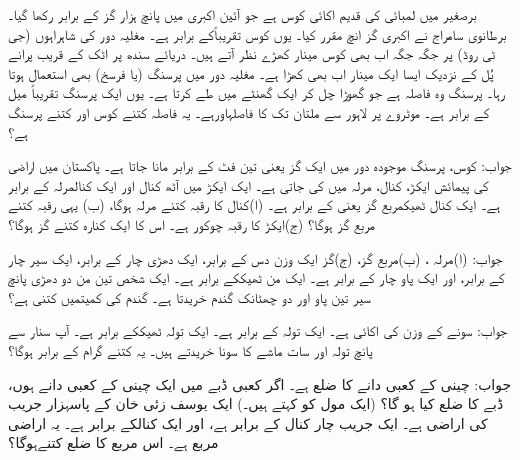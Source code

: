 برصغیر میں لمبائی کی قدیم اکائی کوس ہے جو آئین  اکبری میں پانچ ہزار گز کے برابر رکھا گیا۔ برطانوی سامراج نے  اکبری گز  انچ مقرر کیا۔ یوں  کوس تقریباًکے برابر ہے۔ مغلیہ دور کی شاہراہوں (جی ٹی روڈ) پر جگہ جگہ اب بھی کوس مینار کھڑے نظر آتے ہیں۔ دریائے سندھ پر اٹک کے قریب پرانے پُل کے نزدیک ایسا ایک مینار اب بھی کھڑا ہے۔ مغلیہ دور میں پرسنگ (یا فرسخ)   بھی استعمال ہوتا رہا۔ پرسنگ  وہ فاصلہ ہے جو  گھوڑا چل کر ایک گھنٹے میں طے کرتا ہے۔ یوں ایک پرسنگ تقریباً  میل کے برابر ہے۔ موٹروے پر لاہور سے ملتان تک کا فاصلہاورہے۔ یہ فاصلہ کتنے کوس اور کتنے پرسنگ ہے؟  

جواب: کوس، پرسنگ  
موجودہ دور میں ایک گز   یعنی تین فٹ کے برابر مانا جاتا ہے۔ پاکستان میں  اراضی  کی پیمائش ایکڑ، کنال، مرلہ میں کی جاتی ہے۔ ایک ایکڑ میں آٹھ کنال اور  ایک کنالمرلہ کے برابر ہے۔ ایک کنال ٹھیکمربع گز یعنی  کے برابر ہے۔  (ا)کنال کا رقبہ کتنے مرلہ ہوگا،   (ب) یہی رقبہ کتنے مربع گز ہوگا؟  (ج)ایکڑ کا رقبہ چوکور  ہے۔ اس کا ایک کنارہ کتنے گز ہوگا؟ 

جواب: (ا)مرلہ ، (ب)مربع گز، (ج)گز
ایک   وزن دس  کے برابر، ایک دھڑی  چار  کے برابر، ایک سیر چار  کے برابر،  اور ایک پاو  چار  کے برابر ہے۔ ایک من ٹھیککے برابر ہے۔ ایک شخص تین من دو دھڑی پانچ سیر تین پاو  اور دو چھٹانک  گندم   خریدتا ہے۔ گندم کی کمیتمیں کتنی  ہے؟ 

جواب: 
سونے کے وزن کی اکائی  ہے۔ ایک تولہ  کے برابر ہے۔ ایک تولہ ٹھیککے برابر ہے۔ آپ سنار سے پانچ تولہ اور سات ماشے کا سونا خریدتے ہیں۔ یہ کتنے گرام کے برابر ہوگا؟ 

جواب:  
چینی کے  کعبی  دانے کا ضلع ہے۔ اگر   کعبی ڈبے میں ایک  چینی کے کعبی دانے  ہوں،  ڈبے   کا ضلع کیا ہو گا؟ (ایک مول   کو کہتے ہیں۔) 
ایک یوسف زئی خان کے پاسہزار جریب کی اراضی ہے۔ ایک جریب چار کنال کے برابر ہے، اور ایک کنالکے برابر ہے۔ یہ اراضی  مربع ہے۔ اس مربع کا ضلع کتنےہوگا؟ 


